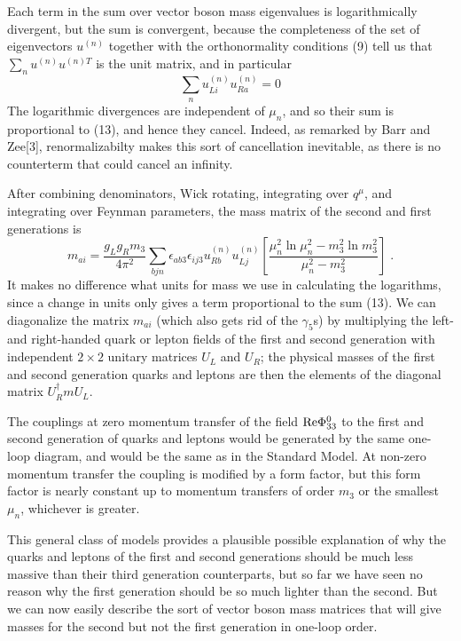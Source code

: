 \documentclass[12pt]{article}
\begin{document}
Each term in the sum over vector boson mass eigenvalues is logarithmically divergent, but the sum is convergent, because 
the completeness of the set of eigenvectors $u^{(n)}$ together with the orthonormality conditions (9) tell us that
$\sum_n u^{(n)}u^{(n)T}$ is the unit matrix, and in particular
\begin{equation}
\sum_n u_{Li}^{(n)}u_{Ra}^{(n)}=0
\end{equation}
The logarithmic divergences are independent of $\mu_n$, and so their sum is proportional to (13), and hence they cancel.  Indeed, as remarked by Barr and Zee[3], renormalizabilty makes this sort of  cancellation  inevitable, as there is no counterterm that could cancel an infinity.

 
After combining denominators, Wick rotating, integrating over $q^\mu$, and integrating over Feynman parameters, the mass matrix of the second and first generations is
\begin{equation}
m_{ai}=\frac{g_Lg_R m_3}{4\pi^2}\sum_{bjn}\epsilon_{ab3}\epsilon_{ij3}  u_{Rb}^{(n)}u_{Lj}^{(n)}\left[\frac{\mu_n^2\ln \mu_n^2-m_3^2\ln m_3^2}{\mu_n^2-m_3^2}
\right]\;.
\end{equation}
It makes no difference what units for mass we use in calculating the logarithms, since a change in units only gives a term proportional to the sum (13).
We can diagonalize the matrix $m_{ai}$ (which also gets rid of the $\gamma_5$s)   by multiplying  the left- and right-handed quark or lepton fields of the first and second generation with independent $2\times 2$  unitary matrices $U_L$ and $U_R$; the physical masses of the first and second generation quarks and leptons are then the  elements of the diagonal matrix $U_R^\dagger m U_L$.  

The couplings at zero momentum transfer of the field ${\rm Re}\Phi^0_{33}$ to the first and second generation of quarks and leptons would be generated by the same one-loop diagram, and would be the same as in the Standard Model.  At non-zero momentum transfer the coupling is modified by a form factor, but this form factor is   nearly  constant up to momentum transfers of order $m_3$ or the smallest $\mu_n$, whichever is greater.


This general class of models provides a plausible possible explanation of why the quarks and leptons of the first and second generations should be much less massive than their third generation counterparts, but so far we have seen no reason why the first generation should be so much lighter than the second.  But we can now easily describe the sort of vector  boson mass matrices that will give  masses for the second but not the first generation in one-loop order.  
\end{document}
